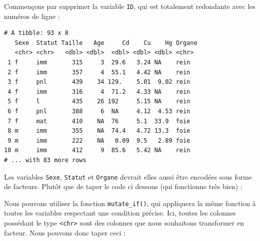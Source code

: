 \documentclass[a4paperpaper,]{article}
\newenvironment{Shaded}{\begin{snugshade}}{\end{snugshade}}
\newcommand{\DataTypeTok}[1]{\textcolor[rgb]{0.00,0.34,0.68}{#1}}
\newcommand{\KeywordTok}[1]{\textcolor[rgb]{0.12,0.11,0.11}{\textbf{#1}}}
\newcommand{\NormalTok}[1]{\textcolor[rgb]{0.12,0.11,0.11}{#1}}
\newcommand{\OperatorTok}[1]{\textcolor[rgb]{0.12,0.11,0.11}{#1}}
\newcommand{\StringTok}[1]{\textcolor[rgb]{0.75,0.01,0.01}{#1}}
\theoremstyle{definition}
\theoremstyle{definition}
\theoremstyle{definition}
\theoremstyle{remark}
\begin{document}
Commençons par supprimer la variable \texttt{ID}, qui est totalement
redondante avec les numéros de ligne :

\begin{Shaded}
\end{Shaded}

\begin{verbatim}
# A tibble: 93 x 8
   Sexe  Statut Taille   Age     Cd    Cu    Hg Organe
   <chr> <chr>   <dbl> <dbl>  <dbl> <dbl> <dbl> <chr> 
 1 f     imm       315     3  29.6   3.24 NA    rein  
 2 f     imm       357     4  55.1   4.42 NA    rein  
 3 f     pnl       439    34 129.    5.01  9.02 rein  
 4 f     imm       316     4  71.2   4.33 NA    rein  
 5 f     l         435    26 192     5.15 NA    rein  
 6 f     pnl       388     6  NA     4.12  4.53 rein  
 7 f     mat       410    NA  76     5.1  33.9  foie  
 8 m     imm       355    NA  74.4   4.72 13.3  foie  
 9 m     imm       222    NA   0.09  9.5   2.89 foie  
10 m     imm       412     9  85.6   5.42 NA    rein  
# ... with 83 more rows
\end{verbatim}

Les variables \texttt{Sexe}, \texttt{Statut} et \texttt{Organe} devrait
elles aussi être encodées sous forme de facteurs. Plutôt que de taper le
code ci dessous (qui fonctionne très bien) :

\begin{Shaded}
\end{Shaded}

Nous pouvons utiliser la fonction \texttt{mutate\_if()}, qui appliquera
la même fonction à toutes les variables respectant une condition
précise. Ici, toutes les colonnes possédant le type
\texttt{\textless{}chr\textgreater{}} sont des colonnes que nous
souhaitons transformer en facteur. Nous pouvons donc taper ceci :
\end{document}
